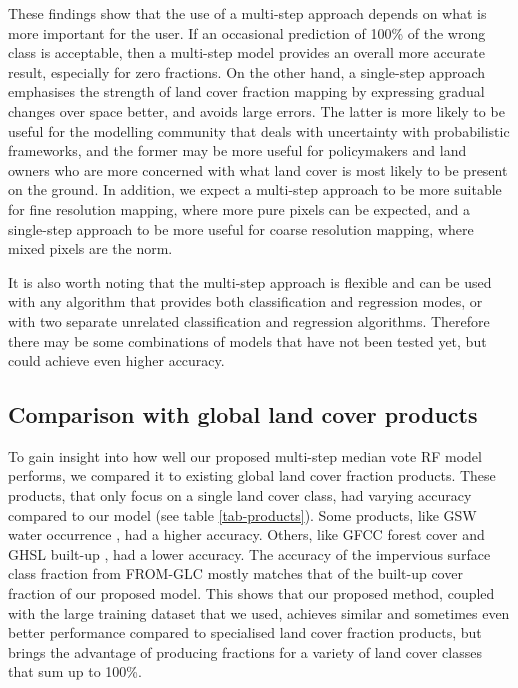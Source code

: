 \documentclass[review,authoryear,3p]{elsarticle}
\begin{document}
These findings show that the use of a multi-step approach depends on what is more important for the user.
If an occasional prediction of 100\% of the wrong class is acceptable, then a multi-step model provides an overall more accurate result, especially for zero fractions.
On the other hand, a single-step approach emphasises the strength of land cover fraction mapping by expressing gradual changes over space better, and avoids large errors.
The latter is more likely to be useful for the modelling community that deals with uncertainty with probabilistic frameworks, and the former may be more useful for policymakers and land owners who are more concerned with what land cover is most likely to be present on the ground.
In addition, we expect a multi-step approach to be more suitable for fine resolution mapping, where more pure pixels can be expected, and a single-step approach to be more useful for coarse resolution mapping, where mixed pixels are the norm.

It is also worth noting that the multi-step approach is flexible and can be used with any algorithm that provides both classification and regression modes, or with two separate unrelated classification and regression algorithms.
Therefore there may be some combinations of models that have not been tested yet, but could achieve even higher accuracy.

\subsection{Comparison with global land cover products}

To gain insight into how well our proposed multi-step median vote \gls{RF} model performs, we compared it to existing global land cover fraction products.
These products, that only focus on a single land cover class, had varying accuracy compared to our model (see table \ref{tab-products}).
Some products, like \gls{GSW} water occurrence \citep{pekel_high-resolution_2016}, had a higher accuracy.
Others, like \gls{GFCC} forest cover \citep{townshend_global_2017} and \gls{GHSL} built-up \citep{corbane_automated_2019}, had a lower accuracy.
The accuracy of the impervious surface class fraction from \gls{FROM-GLC} mostly matches that of the built-up cover fraction of our proposed model.
This shows that our proposed method, coupled with the large training dataset that we used, achieves similar and sometimes even better performance compared to specialised land cover fraction products, but brings the advantage of producing fractions for a variety of land cover classes that sum up to 100\%.
\end{document}
